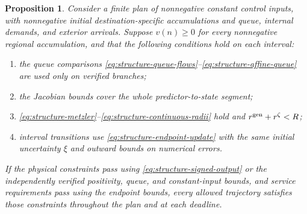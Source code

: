 \documentclass[final]{cas-sc}
\theoremstyle{definition}
\theoremstyle{plain}
\newtheorem{proposition}{Proposition}
\theoremstyle{definition}
\theoremstyle{plain}
\begin{document}
\begin{proposition}
\label{prop:structure-plan}
Consider a finite plan of nonnegative constant control inputs, with
nonnegative initial destination-specific accumulations and queue,
internal demands, and exterior arrivals. Suppose $v(n)\ge0$ for every
nonnegative regional accumulation, and that the following conditions
hold on each interval:
\begin{enumerate}
\renewcommand{\labelenumi}{(\alph{enumi})}
\item the queue comparisons
\eqref{eq:structure-queue-flows}--\eqref{eq:structure-affine-queue} are used only on
verified branches;
\item the Jacobian bounds cover the whole predictor-to-state segment;
\item \eqref{eq:structure-metzler}--\eqref{eq:structure-continuous-radii} hold and
$r^{\rm gen}+r^{\zeta}<R$;
\item interval transitions use \eqref{eq:structure-endpoint-update} with the
same initial uncertainty $\xi$ and outward bounds on numerical errors.
\end{enumerate}
If the physical constraints pass using \eqref{eq:structure-signed-output} or the
independently verified positivity, queue, and constant-input bounds,
and service requirements pass using the endpoint bounds, every allowed
trajectory satisfies those constraints throughout the plan and at each
deadline.
\end{proposition}
\end{document}
